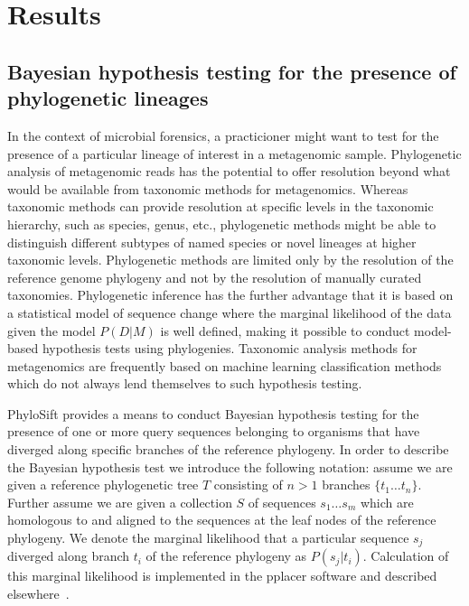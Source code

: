 \documentclass[10pt]{article}
\begin{document}
\section*{Results}

\subsection*{Bayesian hypothesis testing for the presence of phylogenetic lineages}
In the context of microbial forensics, a practicioner might want to test for the presence of a particular lineage of interest in a metagenomic sample.
Phylogenetic analysis of metagenomic reads has the potential to offer resolution beyond what would be available from taxonomic methods for metagenomics.
Whereas taxonomic methods can provide resolution at specific levels in the taxonomic hierarchy, such as species, genus, etc., phylogenetic methods might be able to distinguish different subtypes of named species or novel lineages at higher taxonomic levels.
Phylogenetic methods are limited only by the resolution of the reference genome phylogeny and not by the resolution of manually curated taxonomies.
Phylogenetic inference has the further advantage that it is based on a statistical model of sequence change where the marginal likelihood of the data given the model $P(D|M)$ is well defined, making it possible to conduct model-based hypothesis tests using phylogenies.
Taxonomic analysis methods for metagenomics are frequently based on machine learning classification methods which do not always lend themselves to such hypothesis testing.

PhyloSift provides a means to conduct Bayesian hypothesis testing for the presence of one or more query sequences belonging to organisms that have diverged along specific branches of the reference phylogeny.
In order to describe the Bayesian hypothesis test we introduce the following notation: assume we are given a reference phylogenetic tree $T$ consisting of $n > 1$ branches $\{t_1 \dots t_n\}$.
Further assume we are given a collection $S$ of sequences $s_1 \dots s_m$ which are homologous to and aligned to the sequences at the leaf nodes of the reference phylogeny.
We denote the marginal likelihood that a particular sequence $s_j$ diverged along branch $t_i$ of the reference phylogeny as $P(s_j|t_i)$.
Calculation of this marginal likelihood is implemented in the pplacer software and described elsewhere~\cite{Matsen2010}.
\end{document}
